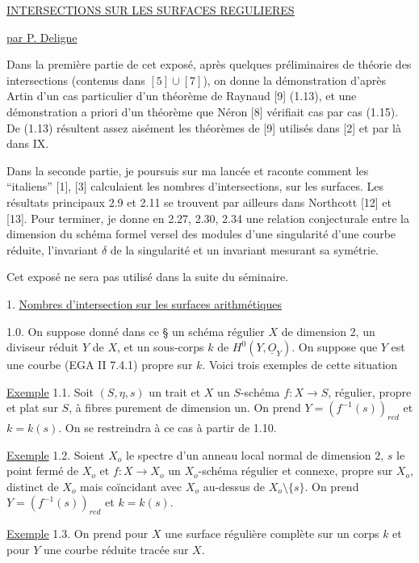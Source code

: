 


\underline{\underline{INTERSECTIONS SUR LES SURFACES REGULIERES}}


\underline{par P. Deligne}

Dans la première partie de cet exposé, après quelques préliminaires de théorie des intersections (contenus dans $[5] \cup [7]$), on donne la démonstration d'après Artin d'un cas particulier d'un théorème de Raynaud [9] (1.13), et une démonstration a priori d'un théorème que Néron [8] vérifiait cas par cas (1.15). De (1.13) résultent assez aisément les théorèmes de [9] utilisés dans [2] et par là dans IX.

Dans la seconde partie, je poursuis sur ma lancée et raconte comment les ``italiens'' [1], [3] calculaient les nombres d'intersections, sur les surfaces. Les résultats principaux 2.9 et 2.11 se trouvent par ailleurs dans Northcott [12] et [13]. Pour terminer, je donne en 2.27, 2.30, 2.34 une relation conjecturale entre la dimension du schéma formel versel des modules d'une singularité d'une courbe réduite, l'invariant $\delta$ de la singularité et un invariant mesurant sa symétrie.

Cet exposé ne sera pas utilisé dans la suite du séminaire.


1. \underline{Nombres d'intersection sur les surfaces arithmétiques}

1.0. On suppose donné dans ce \S{} un schéma régulier $X$ de dimension 2, un diviseur réduit $Y$ de $X$, et un sous-corps $k$ de $H^0(Y,\underline{O}_Y)$. On suppose que $Y$ est une courbe (EGA II 7.4.1) propre sur $k$. Voici trois exemples de cette situation

\underline{Exemple} 1.1. Soit $(S,\eta,s)$ un trait et $X$ un $S$-schéma $f : X \longrightarrow S$, régulier, propre et plat sur $S$, à fibres purement de dimension un. On prend $Y = (f^{-1}(s))_{red}$ et $k = k(s)$. On se restreindra à ce cas à partir de 1.10.



\underline{Exemple} 1.2. Soient $X_o$ le spectre d'un anneau local normal de dimension 2, $s$ le point fermé de $X_o$ et $f : X \longrightarrow X_o$ un $X_o$-schéma régulier et connexe, propre sur $X_o$, distinct de $X_o$ mais coïncidant avec $X_o$ au-dessus de $X_o \setminus \{s\}$. On prend $Y = (f^{-1}(s))_{red}$ et $k = k(s)$.

\underline{Exemple} 1.3. On prend pour $X$ une surface régulière complète sur un corps $k$ et pour $Y$ une courbe réduite tracée sur $X$.

